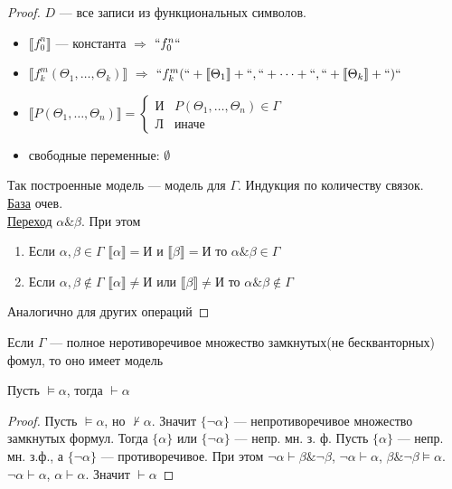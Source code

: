 \documentclass[oneside]{book}
\begin{document}
\begin{proof}
	\(D\) --- все записи из функциональных символов.
	\begin{itemize}
		\item \(\llbracket f_0^n \rrbracket\) --- константа \(\Rightarrow\) \(``f_0^n``\)
		\item \(\llbracket f_k^m (\Theta_1, \dots, \Theta_k) \rrbracket\) \(\Rightarrow\) \(``f_k^m(`` + \llbracket \Theta_1 \rrbracket + ``,`` + \dots + ``,`` + \llbracket \Theta_k \rrbracket + ``)``\)
		\item \(\llbracket P(\Theta_1, \dots, \Theta_n) \rrbracket = \begin{cases} \text{И} & P(\Theta_1, \dots, \Theta_n) \in \Gamma \\ \text{Л} & \text{иначе} \end{cases}\)
		\item свободные переменные: \(\emptyset\)
	\end{itemize}
	Так построенные модель --- модель для \(\Gamma\). Индукция по количеству связок. \\
	\uline{База} очев. \\
	\uline{Переход} \(\alpha \& \beta\). При этом
	\begin{enumerate}
		\item Если \(\alpha, \beta \in \Gamma\) \(\llbracket \alpha \rrbracket = \text{И}\) и \(\llbracket \beta \rrbracket = \text{И}\) то \(\alpha \& \beta \in \Gamma\)
		\item Если \(\alpha, \beta \not\in \Gamma\) \(\llbracket \alpha \rrbracket \neq \text{И}\) или \(\llbracket \beta \rrbracket \neq \text{И}\) то \(\alpha \& \beta \not\in \Gamma\)
	\end{enumerate}
	Аналогично для других операций
\end{proof}
\begin{theorem}
	Если \(\Gamma\) --- полное неротиворечивое множество замкнутых(не бескванторных) фомул, то оно имеет модель
	\label{org07c8afc}
\end{theorem}
\begin{corollary}
	Пусть \(\vDash \alpha\), тогда \(\vdash \alpha\)
	\label{orgaec3872}
\end{corollary}
\begin{proof}
	Пусть \(\vDash \alpha\), но \(\not\vdash \alpha\). Значит \(\{\neg \alpha\}\) --- непротиворечивое множество замкнутых формул. Тогда \(\{\alpha\}\) или \(\{\neg \alpha\}\) --- непр. мн. з. ф. Пусть \(\{\alpha\}\) --- непр. мн. з.ф., а \(\{\neg \alpha\}\) --- противоречивое. При этом \(\neg \alpha \vdash \beta \& \neg \beta\), \(\neg \alpha \vdash \alpha\), \(\beta \& \neg \beta \vDash \alpha\). \(\neg \alpha \vdash \alpha\), \(\alpha \vdash \alpha\). Значит \(\vdash \alpha\)
\end{proof}
\end{document}
